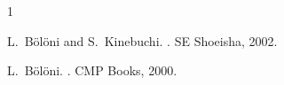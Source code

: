 \begin{thebibliography}{1}

L.~Bölöni and S.~Kinebuchi.
.
\newblock SE Shoeisha, 2002.

L.~Bölöni.
.
\newblock CMP Books, 2000.

\end{thebibliography}
